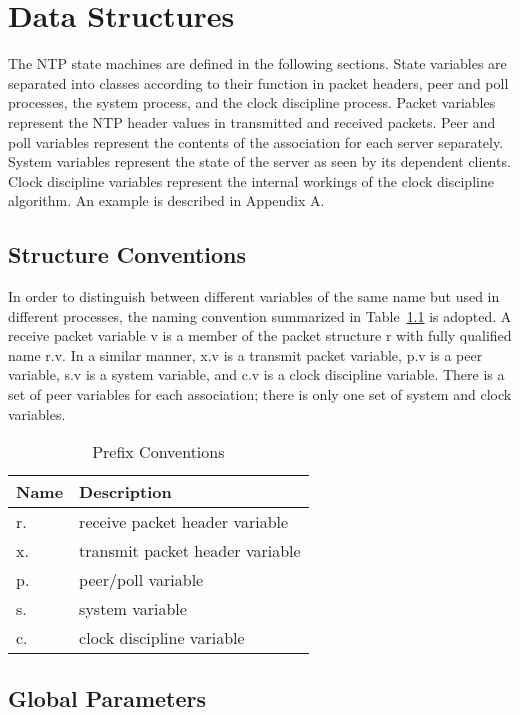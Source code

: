 \chapter{Data Structures}
\label{section-7}

The NTP state machines are defined in the following sections. State
variables are separated into classes according to their function in
packet headers, peer and poll processes, the system process, and the
clock discipline process. Packet variables represent the NTP header
values in transmitted and received packets. Peer and poll variables
represent the contents of the association for each server separately.
System variables represent the state of the server as seen by its
dependent clients. Clock discipline variables represent the internal
workings of the clock discipline algorithm. An example is described
in Appendix A.

\section{Structure Conventions}
\label{section-7-1}

In order to distinguish between different variables of the same name
but used in different processes, the naming convention summarized in
Table~\ref{prefix_conventions} is adopted. A receive packet variable v is a member of the
packet structure r with fully qualified name r.v. In a similar
manner, x.v is a transmit packet variable, p.v is a peer variable,
s.v is a system variable, and c.v is a clock discipline variable.
There is a set of peer variables for each association; there is only
one set of system and clock variables.

\begin{table}[htb]
\center
\begin{tabular}{| l | l |}
\hline
Name & Description \\
\hline
\hline
r. & receive packet header variable \\
x. & transmit packet header variable \\
p. & peer/poll variable \\
s. & system variable \\
c. & clock discipline variable \\
\hline
\end{tabular}
\caption{Prefix Conventions}
\label{prefix_conventions}
\end{table}

\section{Global Parameters}
\label{section-7-2}

